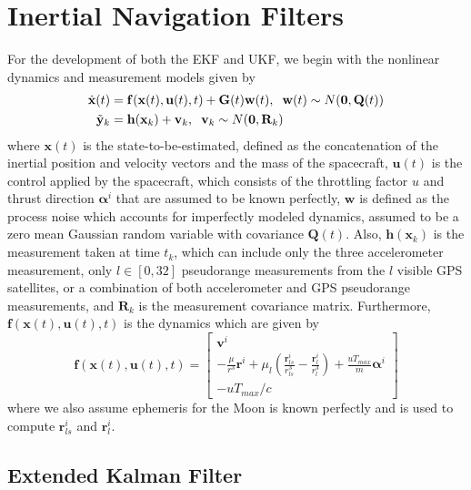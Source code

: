\documentclass[letterpaper, paper,11pt]{AAS}		%
\begin{document}
\section{Inertial Navigation Filters}
For the development of both the EKF and UKF, we begin with the nonlinear dynamics and measurement models given by \cite{Crassidis_2004}
\begin{align}
	\dot{\mathbf{x}}(t) &= \mathbf{f}(\mathbf{x}(t), \mathbf{u}(t),t) + \mathbf{G}(t)\mathbf{w}(t), \hspace{2mm} \mathbf{w}(t)\sim N(\mathbf{0},\mathbf{Q}(t)) \\
	\tilde{\mathbf{y}}_k &= \mathbf{h}(\mathbf{x}_k) + \mathbf{v}_k, \hspace{2mm} \mathbf{v}_k \sim N(\mathbf{0}, \mathbf{R}_k) 
\end{align}
where $\mathbf{x}(t)$ is the state-to-be-estimated, defined as the concatenation of the inertial position and velocity vectors and the mass of the spacecraft, $\mathbf{u}(t)$ is the control applied by the spacecraft, which consists of the throttling factor $u$ and thrust direction $\boldsymbol{\alpha}^i$ that are assumed to be known perfectly, $\mathbf{w}$ is defined as the process noise which accounts for imperfectly modeled dynamics, assumed to be a zero mean Gaussian random variable with covariance $\mathbf{Q}(t)$. Also, $\mathbf{h}(\mathbf{x}_k)$ is the measurement taken at time $t_k$, which can include only the three accelerometer measurement, only $l\in[0,32]$ pseudorange measurements from the $l$ visible GPS satellites, or a combination of both accelerometer and GPS pseudorange measurements, and $\mathbf{R}_k$ is the measurement covariance matrix. Furthermore, $\mathbf{f}(\mathbf{x}(t), \mathbf{u}(t), t)$ is the dynamics which are given by
\begin{equation}
	\mathbf{f}(\mathbf{x}(t),\mathbf{u}(t),t) = \begin{bmatrix} 
		\mathbf{v}^i \\ 
		-\frac{\mu}{r^3}\mathbf{r}^i + \mu_l\left(\frac{\mathbf{r}_{ls}^i}{r_{ls}^3} - \frac{\mathbf{r}_l^i}{r_l^3}\right)  + \frac{uT_{max}}{m}\boldsymbol{\alpha}^i \\
		-uT_{max}/c
	\end{bmatrix}
\end{equation}
where we also assume ephemeris for the Moon is known perfectly and is used to compute $\mathbf{r}_{ls}^i$ and $\mathbf{r}_l^i$. 

\subsection{Extended Kalman Filter}
\end{document}
